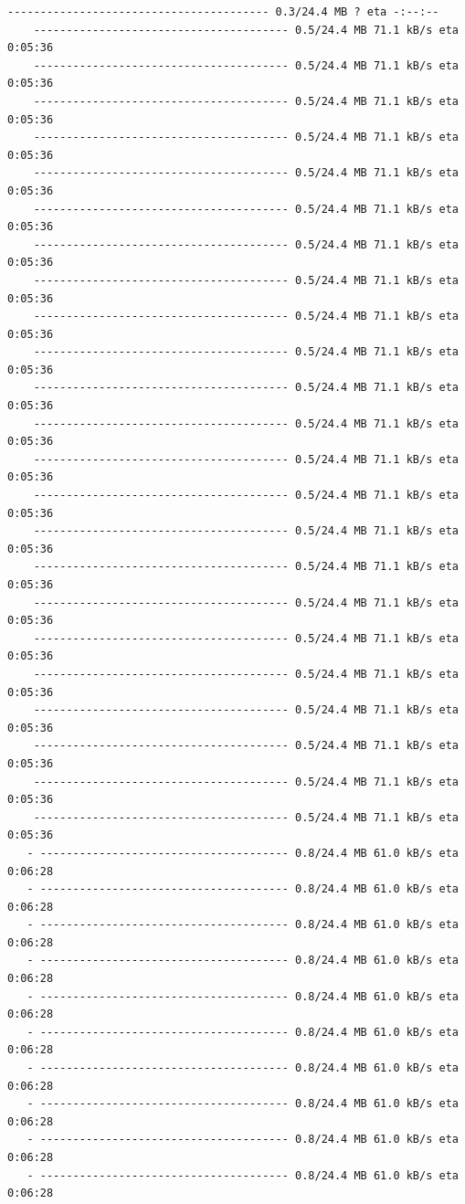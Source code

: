 \documentclass[11pt]{article}
\begin{document}
\begin{Verbatim}[commandchars=\\\{\}]
   ---------------------------------------- 0.3/24.4 MB ? eta -:--:--
    --------------------------------------- 0.5/24.4 MB 71.1 kB/s eta 0:05:36
    --------------------------------------- 0.5/24.4 MB 71.1 kB/s eta 0:05:36
    --------------------------------------- 0.5/24.4 MB 71.1 kB/s eta 0:05:36
    --------------------------------------- 0.5/24.4 MB 71.1 kB/s eta 0:05:36
    --------------------------------------- 0.5/24.4 MB 71.1 kB/s eta 0:05:36
    --------------------------------------- 0.5/24.4 MB 71.1 kB/s eta 0:05:36
    --------------------------------------- 0.5/24.4 MB 71.1 kB/s eta 0:05:36
    --------------------------------------- 0.5/24.4 MB 71.1 kB/s eta 0:05:36
    --------------------------------------- 0.5/24.4 MB 71.1 kB/s eta 0:05:36
    --------------------------------------- 0.5/24.4 MB 71.1 kB/s eta 0:05:36
    --------------------------------------- 0.5/24.4 MB 71.1 kB/s eta 0:05:36
    --------------------------------------- 0.5/24.4 MB 71.1 kB/s eta 0:05:36
    --------------------------------------- 0.5/24.4 MB 71.1 kB/s eta 0:05:36
    --------------------------------------- 0.5/24.4 MB 71.1 kB/s eta 0:05:36
    --------------------------------------- 0.5/24.4 MB 71.1 kB/s eta 0:05:36
    --------------------------------------- 0.5/24.4 MB 71.1 kB/s eta 0:05:36
    --------------------------------------- 0.5/24.4 MB 71.1 kB/s eta 0:05:36
    --------------------------------------- 0.5/24.4 MB 71.1 kB/s eta 0:05:36
    --------------------------------------- 0.5/24.4 MB 71.1 kB/s eta 0:05:36
    --------------------------------------- 0.5/24.4 MB 71.1 kB/s eta 0:05:36
    --------------------------------------- 0.5/24.4 MB 71.1 kB/s eta 0:05:36
    --------------------------------------- 0.5/24.4 MB 71.1 kB/s eta 0:05:36
    --------------------------------------- 0.5/24.4 MB 71.1 kB/s eta 0:05:36
   - -------------------------------------- 0.8/24.4 MB 61.0 kB/s eta 0:06:28
   - -------------------------------------- 0.8/24.4 MB 61.0 kB/s eta 0:06:28
   - -------------------------------------- 0.8/24.4 MB 61.0 kB/s eta 0:06:28
   - -------------------------------------- 0.8/24.4 MB 61.0 kB/s eta 0:06:28
   - -------------------------------------- 0.8/24.4 MB 61.0 kB/s eta 0:06:28
   - -------------------------------------- 0.8/24.4 MB 61.0 kB/s eta 0:06:28
   - -------------------------------------- 0.8/24.4 MB 61.0 kB/s eta 0:06:28
   - -------------------------------------- 0.8/24.4 MB 61.0 kB/s eta 0:06:28
   - -------------------------------------- 0.8/24.4 MB 61.0 kB/s eta 0:06:28
   - -------------------------------------- 0.8/24.4 MB 61.0 kB/s eta 0:06:28

\end{Verbatim}
\end{document}
